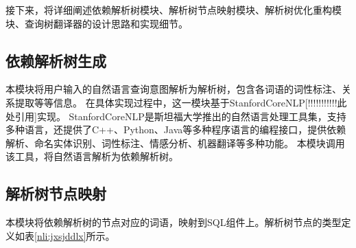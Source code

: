 
接下来，将详细阐述依赖解析树模块、解析树节点映射模块、解析树优化重构模块、查询树翻译器的设计思路和实现细节。

\subsection{依赖解析树生成}
\label{nli:yljxssc}

本模块将用户输入的自然语言查询意图解析为解析树，包含各词语的词性标注、关系提取等等信息。
在具体实现过程中，这一模块基于StanfordCoreNLP[!!!!!!!!!!!此处引用]实现。
StanfordCoreNLP是斯坦福大学推出的自然语言处理工具集，支持多种语言，还提供了C++、Python、Java等多种程序语言的编程接口，提供依赖解析、命名实体识别、词性标注、情感分析、机器翻译等多种功能。
本模块调用该工具，将自然语言解析为依赖解析树。

\subsection{解析树节点映射}
\label{nli:jxsjdys}
本模块将依赖解析树的节点对应的词语，映射到SQL组件上。解析树节点的类型定义如表\ref{nli:jxsjddlx}所示。


